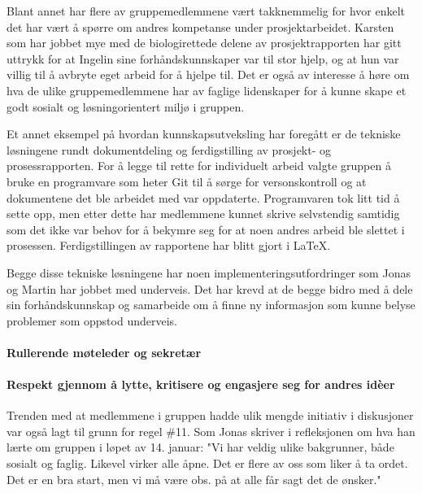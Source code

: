 Blant annet har flere av gruppemedlemmene vært takknemmelig for hvor enkelt det har vært å spørre om andres kompetanse under prosjektarbeidet.
Karsten som har jobbet mye med de biologirettede delene av prosjektrapporten har gitt uttrykk for at Ingelin sine forhåndskunnskaper var til stor hjelp, og at hun var villig til å avbryte eget arbeid for å hjelpe til.
Det er også av interesse å høre om hva de ulike gruppemedlemmene har av faglige lidenskaper for å kunne skape et godt sosialt og løsningorientert miljø i gruppen.

Et annet eksempel på hvordan kunnskapsutveksling har foregått er de tekniske løsningene rundt dokumentdeling og ferdigstilling av prosjekt- og prosessrapporten.
For å legge til rette for individuelt arbeid valgte gruppen å bruke en programvare som heter Git til å sørge for versonskontroll og at dokumentene det ble arbeidet med var oppdaterte.
Programvaren tok litt tid å sette opp, men etter dette har medlemmene kunnet skrive selvstendig samtidig som det ikke var behov for å bekymre seg for at noen andres arbeid ble slettet i prosessen.
Ferdigstillingen av rapportene har blitt gjort i \LaTeX.

Begge disse tekniske løsningene har noen implementeringsutfordringer som Jonas og Martin har jobbet med underveis.
Det har krevd at de begge bidro med å dele sin forhåndskunnskap og samarbeide om å finne ny informasjon som kunne belyse problemer som oppstod underveis.



\paragraph{Rullerende møteleder og sekretær}



\paragraph{Respekt gjennom å lytte, kritisere og engasjere seg for andres id\`{e}er}
Trenden med at medlemmene i gruppen hadde ulik mengde initiativ i diskusjoner var også lagt til grunn for regel \#11.
Som Jonas skriver i refleksjonen om hva han lærte om gruppen i løpet av 14. januar:
"Vi har veldig ulike bakgrunner, både sosialt og faglig. Likevel virker alle åpne. Det er flere av oss som liker å ta ordet. Det er en bra start, men vi må være obs. på at alle får sagt det de ønsker."

















